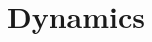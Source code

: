 \documentclass[fleqn,usenatbib,onecolumn]{mnras}
\title{}
\date{}
\begin{document}
\maketitle

\thispagestyle{empty} %
\pagestyle{plain}     %

\section{Dynamics}
\citep{kaur_semianalytical_2024}



\end{document}

